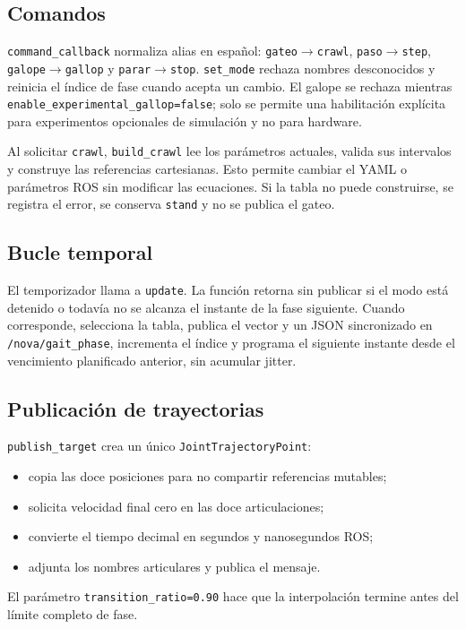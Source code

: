 \documentclass[11pt,a4paper]{article}
\begin{document}
\subsection{Comandos}
\texttt{command\_callback} normaliza alias en español:
\texttt{gateo}$\rightarrow$\texttt{crawl},
\texttt{paso}$\rightarrow$\texttt{step},
\texttt{galope}$\rightarrow$\texttt{gallop} y
\texttt{parar}$\rightarrow$\texttt{stop}. \texttt{set\_mode} rechaza nombres
desconocidos y reinicia el índice de fase cuando acepta un cambio.
El galope se rechaza mientras
\texttt{enable\_experimental\_gallop=false}; solo se permite una habilitación
explícita para experimentos opcionales de simulación y no para hardware.

Al solicitar \texttt{crawl}, \texttt{build\_crawl} lee los parámetros actuales,
valida sus intervalos y construye las referencias cartesianas. Esto permite
cambiar el YAML o parámetros ROS sin modificar las ecuaciones. Si la tabla no
puede construirse, se registra el error, se conserva \texttt{stand} y no se
publica el gateo.

\subsection{Bucle temporal}
El temporizador llama a \texttt{update}. La función retorna sin publicar si el
modo está detenido o todavía no se alcanza el instante de la fase siguiente.
Cuando corresponde, selecciona la tabla, publica el vector y un JSON sincronizado
en \texttt{/nova/gait\_phase}, incrementa el índice y programa el siguiente
instante desde el vencimiento planificado anterior, sin acumular jitter.

\subsection{Publicación de trayectorias}
\texttt{publish\_target} crea un único \texttt{JointTrajectoryPoint}:
\begin{itemize}
\item copia las doce posiciones para no compartir referencias mutables;
\item solicita velocidad final cero en las doce articulaciones;
\item convierte el tiempo decimal en segundos y nanosegundos ROS;
\item adjunta los nombres articulares y publica el mensaje.
\end{itemize}
El parámetro \texttt{transition\_ratio=0.90} hace que la interpolación termine
antes del límite completo de fase.
\end{document}
